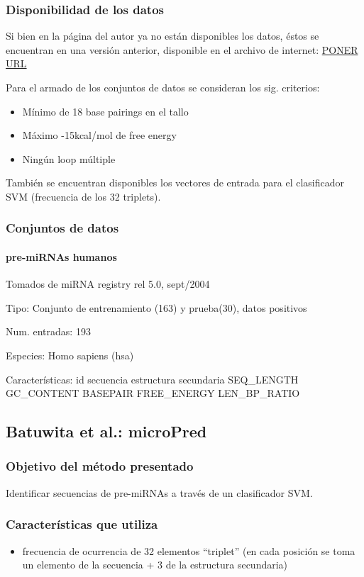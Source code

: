 \documentclass[12pt,bibliography=openstyle,DIV=12,parskip=half-]{scrartcl}
\begin{document}
\subsubsection{Disponibilidad de los datos}
Si bien en la página del autor ya no están disponibles los datos, éstos se encuentran
en una versión anterior, disponible en el archivo de internet: \url{PONER URL}

Para el armado de los conjuntos de datos se consideran los sig. criterios:
\begin{itemize}
\item Mínimo de 18 base pairings en el tallo
\item Máximo -15kcal/mol de free energy
\item Ningún loop múltiple
\end{itemize}

También se encuentran disponibles los vectores de entrada para el
clasificador SVM (frecuencia de los 32 triplets).
%
\subsubsection{Conjuntos de datos}
\paragraph{pre-miRNAs humanos}
Tomados de miRNA registry rel 5.0, sept/2004
\begin{description*}
\item[Tipo:] Conjunto de entrenamiento (163) y prueba(30), datos positivos
\item[Num. entradas:] 193
\item[Especies:] Homo sapiens (hsa)
\item[Características:]
id \quad
secuencia \quad
estructura secundaria \quad
SEQ\_LENGTH \quad
GC\_CONTENT \quad
BASEPAIR \quad
FREE\_ENERGY \quad
LEN\_BP\_RATIO
\end{description*}
%
%
%
%
%
\subsection{Batuwita et al.: microPred}
\subsubsection{Objetivo del método presentado}
Identificar secuencias de pre-miRNAs a través de un clasificador SVM.
\subsubsection{Características que utiliza}
\begin{itemize}
\item frecuencia de ocurrencia de 32 elementos ``triplet''
  (en cada posición se toma un elemento de la secuencia + 3 de la estructura secundaria)
\end{itemize}
\end{document}
